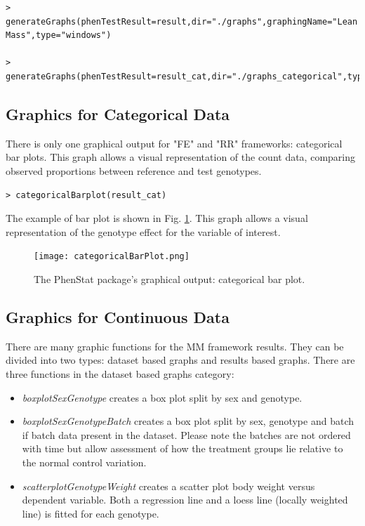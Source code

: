 \documentclass[12pt,a4paper]{article}
\begin{document}
\begingroup
    \fontsize{8pt}{12pt}\selectfont
\begin{verbatim}
> generateGraphs(phenTestResult=result,dir="./graphs",graphingName="Lean Mass",type="windows")

> generateGraphs(phenTestResult=result_cat,dir="./graphs_categorical",type="windows")
\end{verbatim}
\endgroup 

\subsection{Graphics for Categorical Data}
There is only one graphical output for "FE" and "RR" frameworks: categorical bar plots. This graph allows a visual representation of the count data, comparing observed proportions between reference and test genotypes.  


\begingroup
    \fontsize{8pt}{12pt}\selectfont
\begin{verbatim}
> categoricalBarplot(result_cat)
\end{verbatim}
\endgroup 

The example of bar plot is shown in Fig. \ref{fig:06}. This graph allows a visual representation of the genotype effect for the variable of interest.
\begin{figure}[!htpb]%
\centerline{\texttt{[image: categoricalBarPlot.png]}}
\caption{The PhenStat package's graphical output: categorical bar plot.}\label{fig:06}
\end{figure}

\subsection{Graphics for Continuous Data}
There are many graphic functions for the MM framework results. They can be divided into two types: dataset based graphs and results based graphs.
There are three functions in the dataset based graphs category:
\begin{itemize}
\item \textit{boxplotSexGenotype} creates a box plot split by sex and genotype.
\item \textit{boxplotSexGenotypeBatch} creates a box plot split by sex, genotype and batch if batch data present in the dataset. Please note the batches are not ordered with time but allow assessment of how the treatment groups lie relative to the normal control variation.
\item \textit{scatterplotGenotypeWeight} creates a scatter plot body weight versus dependent variable. Both a regression line and a loess line (locally weighted line) is fitted for each genotype.
\end{itemize}
\end{document}
